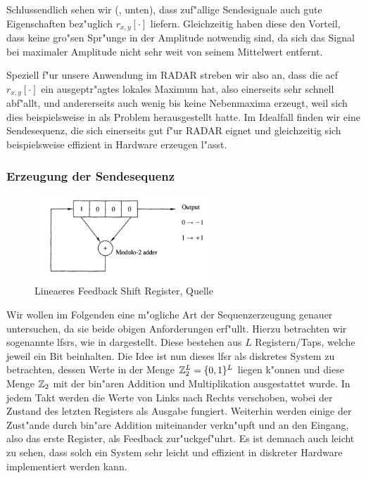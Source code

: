 Schlussendlich sehen wir (, unten), dass zuf"allige Sendesignale auch gute Eigenschaften bez"uglich $r_{x,y}[\cdot]$ liefern.
Gleichzeitig haben diese den Vorteil, dass keine gro"sen Spr"unge in der Amplitude notwendig sind, da sich das Signal bei maximaler Amplitude nicht sehr weit von seinem Mittelwert entfernt.

Speziell f"ur unsere Anwendung im RADAR streben wir also an, dass die \gls{acf} $r_{x,y}[\cdot]$ ein ausgeptr"agtes lokales Maximum hat, also einerseits sehr schnell abf"allt, und andererseits auch wenig bis keine Nebenmaxima erzeugt, weil sich dies beispielsweise in  als Problem herausgestellt hatte.
Im Idealfall finden wir eine Sendesequenz, die sich einerseits gut f"ur RADAR eignet und gleichzeitig sich beispielsweise effizient in Hardware erzeugen l"asst.

\FloatBarrier
\subsubsection{Erzeugung der Sendesequenz}
%
\begin{figure}
    \begin{center}
        \includegraphics[width=0.6\textwidth]{img/lfsr_1.png}
    \end{center}
    \caption{Lineaeres Feedback Shift Register, Quelle \cite{proakis2013}}\label{fig:mseq:lfsr}
\end{figure}
%
Wir wollen im Folgenden eine m"ogliche Art der Sequenzerzeugung genauer untersuchen, da sie beide obigen Anforderungen erf"ullt.
Hierzu betrachten wir sogenannte \glspl{lfsr}, wie in  dargestellt.
Diese bestehen aus $L$ Registern/Taps, welche jeweil ein Bit beinhalten.
Die Idee ist nun dieses \gls{lfsr} als diskretes System zu betrachten, dessen Werte in der Menge $\mathbb{Z}_2^L = \{0,1\}^L$ liegen k"onnen und diese Menge $\mathbb{Z}_2$ mit der bin"aren Addition und Multiplikation ausgestattet wurde.
In jedem Takt werden die Werte von Links nach Rechts verschoben, wobei der Zustand des letzten Registers als Ausgabe fungiert.
Weiterhin werden einige der Zust"ande durch bin"are Addition miteinander verkn"upft und an den Eingang, also das erste Register, als Feedback zur"uckgef"uhrt.
Es ist demnach auch leicht zu sehen, dass solch ein System sehr leicht und effizient in diskreter Hardware implementiert werden kann.


